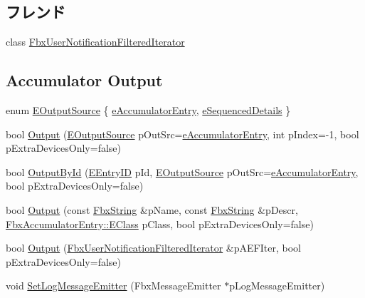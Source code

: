 \subsection*{フレンド}
\begin{DoxyCompactItemize}
\item 
class \hyperlink{class_fbx_user_notification_a991cf5f73d3877784532bf31cbf31c4a}{Fbx\+User\+Notification\+Filtered\+Iterator}
\end{DoxyCompactItemize}
\subsection*{Accumulator Output}
\begin{DoxyCompactItemize}
\item 
enum \hyperlink{class_fbx_user_notification_a45290aa788e47fce1d7b8a88687aa184}{E\+Output\+Source} \{ \hyperlink{class_fbx_user_notification_a45290aa788e47fce1d7b8a88687aa184a04843bd5dec0b90ac08d75d8f33309af}{e\+Accumulator\+Entry}, 
\hyperlink{class_fbx_user_notification_a45290aa788e47fce1d7b8a88687aa184a4f1172f3c9c59d12a175a66c71be2101}{e\+Sequenced\+Details}
 \}
\item 
bool \hyperlink{class_fbx_user_notification_a0bcf59aa5f9923410bc150a73b088017}{Output} (\hyperlink{class_fbx_user_notification_a45290aa788e47fce1d7b8a88687aa184}{E\+Output\+Source} p\+Out\+Src=\hyperlink{class_fbx_user_notification_a45290aa788e47fce1d7b8a88687aa184a04843bd5dec0b90ac08d75d8f33309af}{e\+Accumulator\+Entry}, int p\+Index=-\/1, bool p\+Extra\+Devices\+Only=false)
\item 
bool \hyperlink{class_fbx_user_notification_a22dade0b65bc7f09650539dbb6cb8741}{Output\+By\+Id} (\hyperlink{class_fbx_user_notification_a88d8e70c3d6881a5bfe7531079ac6831}{E\+Entry\+ID} p\+Id, \hyperlink{class_fbx_user_notification_a45290aa788e47fce1d7b8a88687aa184}{E\+Output\+Source} p\+Out\+Src=\hyperlink{class_fbx_user_notification_a45290aa788e47fce1d7b8a88687aa184a04843bd5dec0b90ac08d75d8f33309af}{e\+Accumulator\+Entry}, bool p\+Extra\+Devices\+Only=false)
\item 
bool \hyperlink{class_fbx_user_notification_ac1554ef15d2ea0357f22d58a75bb3754}{Output} (const \hyperlink{class_fbx_string}{Fbx\+String} \&p\+Name, const \hyperlink{class_fbx_string}{Fbx\+String} \&p\+Descr, \hyperlink{class_fbx_accumulator_entry_af08af3ddcbf7e8fe642d7e9ecb4ad0e2}{Fbx\+Accumulator\+Entry\+::\+E\+Class} p\+Class, bool p\+Extra\+Devices\+Only=false)
\item 
bool \hyperlink{class_fbx_user_notification_a42fbce70476e34410d36cfb456a4d55f}{Output} (\hyperlink{class_fbx_user_notification_filtered_iterator}{Fbx\+User\+Notification\+Filtered\+Iterator} \&p\+A\+E\+F\+Iter, bool p\+Extra\+Devices\+Only=false)
\item 
void \hyperlink{class_fbx_user_notification_ab58b3104014b80b853b43f1a264bb999}{Set\+Log\+Message\+Emitter} (Fbx\+Message\+Emitter $\ast$p\+Log\+Message\+Emitter)
\end{DoxyCompactItemize}


